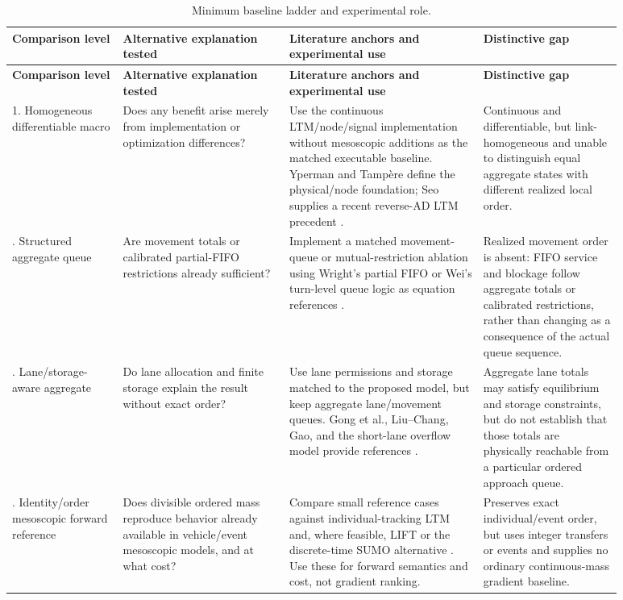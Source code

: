 \documentclass[11pt,a4paper]{article}
\begin{document}
\begin{longtable}{p{0.16\linewidth}p{0.24\linewidth}p{0.28\linewidth}p{0.20\linewidth}}
\caption{Minimum baseline ladder and experimental role.}\label{tab:ladder}\\
\toprule
\textbf{Comparison level} & \textbf{Alternative explanation tested} & \textbf{Literature anchors and experimental use} & \textbf{Distinctive gap}\\
\midrule
\endfirsthead
\toprule
\textbf{Comparison level} & \textbf{Alternative explanation tested} & \textbf{Literature anchors and experimental use} & \textbf{Distinctive gap}\\
\midrule
\endhead
1. Homogeneous differentiable macro & Does any benefit arise merely from implementation or optimization differences? & Use the continuous LTM/node/signal implementation without mesoscopic additions as the matched executable baseline. Yperman and Tampère define the physical/node foundation; Seo supplies a recent reverse-AD LTM precedent \cite{yperman2007,tampere2011,seo2026}. & Continuous and differentiable, but link-homogeneous and unable to distinguish equal aggregate states with different realized local order.\\
\addlinespace
2. Structured aggregate queue & Are movement totals or calibrated partial-FIFO restrictions already sufficient? & Implement a matched movement-queue or mutual-restriction ablation using Wright's partial FIFO or Wei's turn-level queue logic as equation references \cite{wright2017,wei2025}. & Realized movement order is absent: FIFO service and blockage follow aggregate totals or calibrated restrictions, rather than changing as a consequence of the actual queue sequence.\\
\addlinespace
3. Lane/storage-aware aggregate & Do lane allocation and finite storage explain the result without exact order? & Use lane permissions and storage matched to the proposed model, but keep aggregate lane/movement queues. Gong et al., Liu--Chang, Gao, and the short-lane overflow model provide references \cite{gong2025,liu2011,gao2012,wang2020}. & Aggregate lane totals may satisfy equilibrium and storage constraints, but do not establish that those totals are physically reachable from a particular ordered approach queue.\\
\addlinespace
4. Identity/order mesoscopic forward reference & Does divisible ordered mass reproduce behavior already available in vehicle/event mesoscopic models, and at what cost? & Compare small reference cases against individual-tracking LTM and, where feasible, LIFT or the discrete-time SUMO alternative \cite{desouza2025,nietal2026,nisumo2026}. Use these for forward semantics and cost, not gradient ranking. & Preserves exact individual/event order, but uses integer transfers or events and supplies no ordinary continuous-mass gradient baseline.\\
\bottomrule
\end{longtable}
\end{document}
